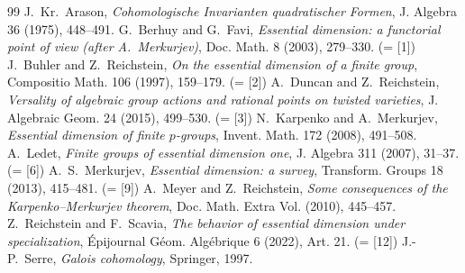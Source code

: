 \documentclass[11pt]{amsart}
\theoremstyle{definition}
\theoremstyle{remark}
\begin{document}
\begin{thebibliography}{99}
\setcounter{enumiv}{16}
 J.~Kr.~Arason, \emph{Cohomologische Invarianten quadratischer Formen},
J. Algebra 36 (1975), 448--491.
 G.~Berhuy and G.~Favi, \emph{Essential dimension: a functorial point of
view (after A.~Merkurjev)}, Doc. Math. 8 (2003), 279--330. (= [1])
 J.~Buhler and Z.~Reichstein, \emph{On the essential dimension of a finite
group}, Compositio Math. 106 (1997), 159--179. (= [2])
 A.~Duncan and Z.~Reichstein, \emph{Versality of algebraic group actions
and rational points on twisted varieties}, J. Algebraic Geom. 24 (2015), 499--530.
(= [3])
 N.~Karpenko and A.~Merkurjev, \emph{Essential dimension of finite
$p$-groups}, Invent. Math. 172 (2008), 491--508.
 A.~Ledet, \emph{Finite groups of essential dimension one}, J. Algebra
311 (2007), 31--37. (= [6])
 A.~S.~Merkurjev, \emph{Essential dimension: a survey}, Transform. Groups
18 (2013), 415--481. (= [9])
 A.~Meyer and Z.~Reichstein, \emph{Some consequences of the
Karpenko--Merkurjev theorem}, Doc. Math. Extra Vol. (2010), 445--457.
 Z.~Reichstein and F.~Scavia, \emph{The behavior of essential dimension
under specialization}, \'Epijournal G\'eom. Alg\'ebrique 6 (2022), Art. 21. (= [12])
 J.-P.~Serre, \emph{Galois cohomology}, Springer, 1997.
\end{thebibliography}
\end{document}
